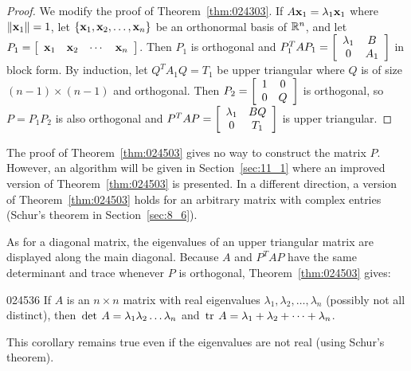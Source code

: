 \begin{proof}
We modify the proof of Theorem~\ref{thm:024303}. If $A\textbf{x}_{1} = \lambda_{1}\textbf{x}_{1}$ where $\|\textbf{x}_{1}\| = 1$, let $\{\textbf{x}_{1}, \textbf{x}_{2}, \dots, \textbf{x}_{n}\}$ be an orthonormal basis of $\mathbb{R}^n$, and let $P_{1} = \left[ \begin{array}{cccc}
\textbf{x}_{1} & \textbf{x}_{2} & \cdots &  \textbf{x}_{n}
\end{array}\right]$. Then $P_{1}$ is orthogonal and $P_{1}^TAP_{1} = \left[ \begin{array}{cc}
\lambda_{1} & B \\
0 & A_{1}
\end{array}\right]$ in block form. By induction, let $Q^{T}A_{1}Q = T_{1}$ be upper triangular where $Q$ is of size $(n-1)\times(n-1)$ and orthogonal. Then $P_{2} = \left[ \begin{array}{cc}
1 & 0 \\
0 & Q
\end{array}\right]$ is orthogonal, so $P = P_{1}P_{2}$ is also orthogonal and $P^TAP = \left[ \begin{array}{cc}
\lambda_{1} & BQ \\
0 & T_{1}
\end{array}\right]$
 is upper triangular.
\end{proof}

\noindent The proof of Theorem~\ref{thm:024503} gives no way to construct the matrix $P$. However, an algorithm will be given in Section~\ref{sec:11_1} where an improved version of Theorem~\ref{thm:024503} is presented. In a different direction, a version of Theorem~\ref{thm:024503} holds for an arbitrary matrix with complex entries (Schur's theorem in Section~\ref{sec:8_6}).


As for a diagonal matrix, the eigenvalues of an upper triangular matrix are displayed along the main diagonal. Because $A$ and $P^{T}AP$ have the same determinant and trace whenever $P$ is orthogonal, Theorem~\ref{thm:024503} gives:


\begin{corollary}{}{024536}
If $A$ is an $n \times n$ matrix with real eigenvalues $\lambda_{1}, \lambda_{2}, \dots, \lambda_{n}$ (possibly not all distinct), then $\thinspace\operatorname{det\medspace}A = \lambda_{1}\lambda_{2} \dots \lambda_{n}$ and $\thinspace\operatorname{tr\medspace}A = \lambda_{1} + \lambda_{2} + \dots  + \lambda_{n}$.
\end{corollary}

\noindent This corollary remains true even if the eigenvalues are not real (using Schur's theorem).


